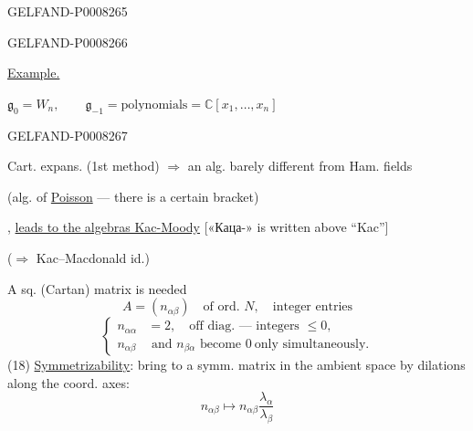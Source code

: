\begin{GelfandAdjacentEvidence}{GELFAND-P000826}{5}


\end{GelfandAdjacentEvidence}
\begin{GelfandAdjacentEvidence}{GELFAND-P000826}{6}


\uline{Example.}

\(\mathfrak g_0=W_n,\qquad
\mathfrak g_{-1}=\text{polynomials}=\mathbb{C}[x_1,\ldots,x_n]\)
\end{GelfandAdjacentEvidence}
\begin{GelfandAdjacentEvidence}{GELFAND-P000826}{7}


Cart. expans. (1st method) \(\Rightarrow\) an alg. barely different from Ham. fields

(alg. of \uline{Poisson} — there is a certain bracket)

\end{GelfandAdjacentEvidence}


, \uline{leads to the algebras Kac-Moody} [«Каца-» is written above “Kac”]

(\(\Rightarrow\) Kac–Macdonald id.)

A sq. (Cartan) matrix is needed
\begin{equation*}
A=(n_{\alpha\beta})\quad\text{of ord. }N,\quad\text{integer entries}\tag{16}
\end{equation*}
\begin{equation*}
\left\{\begin{aligned}
n_{\alpha\alpha}&=2,\quad\text{off diag. — integers }\le0,\\
n_{\alpha\beta}&\text{ and }n_{\beta\alpha}\text{ become }0\ \text{only simultaneously}.
\end{aligned}\right.\tag{17}
\end{equation*}
(18) \uline{Symmetrizability}: bring to a symm. matrix in the ambient space by dilations along the coord. axes:
\[
n_{\alpha\beta}\mapsto n_{\alpha\beta}\frac{\lambda_\alpha}{\lambda_\beta}
\]



